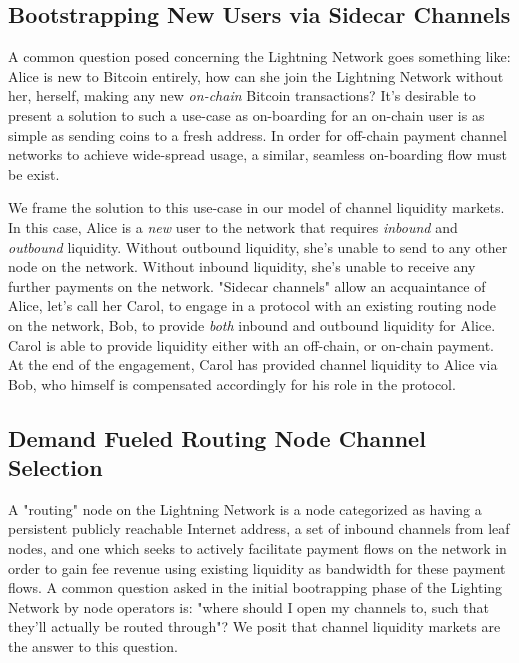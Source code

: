 \documentclass[10pt,a4paper]{article}
\theoremstyle{definition}
\begin{document}
\subsection{Bootstrapping New Users via Sidecar Channels}

A common question posed concerning the Lightning Network goes something like:
Alice is new to Bitcoin entirely, how can she join the Lightning Network
without her, herself, making any new \emph{on-chain} Bitcoin transactions? It's
desirable to present a solution to such a use-case as on-boarding for an on-chain
user is as simple as sending coins to a fresh address. In order for
off-chain payment channel networks to achieve wide-spread usage, a similar,
seamless on-boarding flow must be exist.

We frame the solution to this use-case in our model of channel liquidity
markets. In this case, Alice is a \emph{new} user to the network that requires
\emph{inbound} and \emph{outbound} liquidity. Without outbound liquidity, she's
unable to send to any other node on the network. Without inbound liquidity,
she's unable to receive any further payments on the network. "Sidecar channels"
allow an acquaintance of Alice, let's call her
Carol, to engage in a protocol with an existing routing node on the network,
Bob, to provide \emph{both} inbound and outbound liquidity for Alice. Carol is
able to provide liquidity either with an off-chain, or on-chain payment. At the
end of the engagement, Carol has provided channel liquidity to Alice via Bob,
who himself is compensated accordingly for his role in the protocol. 

\subsection{Demand Fueled Routing Node Channel Selection}

A "routing" node on the Lightning Network is a node categorized as having a
persistent publicly reachable Internet address, a set of inbound channels from
leaf nodes, and one which seeks to actively facilitate payment flows on the
network in order to gain fee revenue using existing liquidity as
bandwidth for these payment flows. A common question asked in the initial
bootrapping phase of the Lighting Network by node operators is: "where should I
open my channels to, such that they'll actually be routed through"? We posit
that channel liquidity markets are the answer to this question.
\end{document}

